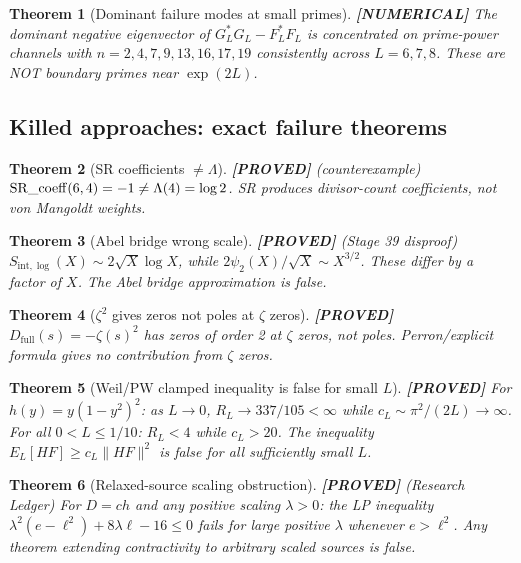 \documentclass[11pt]{article}
\newtheorem{theorem}{Theorem}[section]
\theoremstyle{remark}
\newcommand{\PROVED}{\textbf{\color{blue}[PROVED]}}
\newcommand{\NUMERICAL}{\textbf{\color{orange}[NUMERICAL]}}
\DeclareRobustCommand{\_}{\ifmmode\text{\textunderscore}\else\textunderscore\allowbreak\fi}
\begin{document}
\begin{theorem}[Dominant failure modes at small primes] \NUMERICAL{}
The dominant negative eigenvector of $G_L^* G_L - F_L^* F_L$ is concentrated on
prime-power channels with $n = 2, 4, 7, 9, 13, 16, 17, 19$
consistently across $L = 6, 7, 8$. These are NOT boundary primes near $\exp(2L)$.
\end{theorem}

\subsection{Killed approaches: exact failure theorems}

\begin{theorem}[SR coefficients $\neq \Lambda$] \PROVED{} (counterexample)
$\operatorname{SR\_coeff}(6, 4) = -1 \neq \Lambda(4) = \log 2$.
SR produces divisor-count coefficients, not von Mangoldt weights.
\end{theorem}

\begin{theorem}[Abel bridge wrong scale] \PROVED{} (Stage 39 disproof)
$S_{\mathrm{int},\log}(X) \sim 2\sqrt{X}\log X$, while $2\psi_2(X)/\sqrt{X} \sim X^{3/2}$.
These differ by a factor of $X$. The Abel bridge approximation is false.
\end{theorem}

\begin{theorem}[$\zeta^2$ gives zeros not poles at $\zeta$ zeros] \PROVED{}
$D_{\mathrm{full}}(s) = -\zeta(s)^2$ has \emph{zeros} of order 2 at $\zeta$ zeros,
not poles. Perron/explicit formula gives no contribution from $\zeta$ zeros.
\end{theorem}

\begin{theorem}[Weil/PW clamped inequality is false for small $L$] \PROVED{}
For $h(y) = y(1-y^2)^2$: as $L \to 0$, $R_L \to 337/105 < \infty$
while $c_L \sim \pi^2/(2L) \to \infty$.
For all $0 < L \leq 1/10$: $R_L < 4$ while $c_L > 20$.
The inequality $E_L[HF] \geq c_L\|HF\|^2$ is false for all sufficiently small $L$.
\end{theorem}

\begin{theorem}[Relaxed-source scaling obstruction] \PROVED{} (Research Ledger)
For $D = ch$ and any positive scaling $\lambda > 0$: the LP inequality
$\lambda^2(e - \ell^2) + 8\lambda\ell - 16 \leq 0$ fails for large positive $\lambda$ whenever $e > \ell^2$.
Any theorem extending contractivity to arbitrary scaled sources is false.
\end{theorem}
\end{document}
